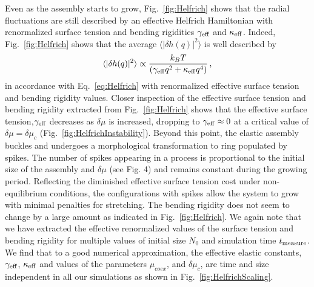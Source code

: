 \documentclass[amsmath,preprintnumbers,10pt,nofootinbib,prl,twocolumn]{revtex4-1}
\begin{document}
Even as the assembly starts to grow, Fig.~\ref{fig:Helfrich} shows that the radial fluctuations are still described by an effective Helfrich Hamiltonian with renormalized surface tension and bending rigidities $\gamma_{\rm eff}$ and $\kappa_{\rm eff}$. Indeed, Fig.~\ref{fig:Helfrich} shows that the average $\langle |\delta h(q)|^2 \rangle$ is well described by 
\begin{equation}
\langle |\delta h(q)|^2 \rangle \propto \frac{k_B T}{(\gamma_{\rm eff} q^2 + \kappa_{\rm eff} q^4)}\,,
\label{eq:HelfrichFT}
\end{equation}
in accordance with Eq.~\ref{eq:Helfrich} with renormalized effective surface tension and bending rigidity values. Closer inspection of the effective surface tension and bending rigidity extracted from Fig.~\ref{fig:Helfrich} shows that the effective surface tension,$\gamma_{\rm eff}$ decreases as $\delta \mu$ is increased, dropping to $\gamma_{\rm eff}\approx 0$ at a critical value of $\delta \mu=\delta \mu_c$ (Fig.~\ref{fig:HelfrichInstability}). Beyond this point, the elastic assembly buckles and undergoes a morphological transformation to ring populated by \textit{}{spikes}. The number of spikes appearing in a process is proportional to the initial size of the assembly and $\delta\mu$ (see Fig. 4) and remains constant during the growing period. 
Reflecting the diminished effective surface tension cost under non-equilibrium conditions, the configurations with spikes allow the system to grow with minimal penalties for stretching. The bending rigidity does not seem to change by a large amount as indicated in Fig.~\ref{fig:Helfrich}. We again note that we have extracted the effective renormalized values of the surface tension and bending rigidity for multiple values of initial size $N_0$ and simulation time $t_{\rm measure}$. We find that to a good numerical approximation, the effective elastic constants, $\gamma_{\rm eff}$, $\kappa_{\rm eff}$ and values of the parameters $\mu_{coex}$, and $\delta \mu_c$, are time and size independent in all our simulations as shown in Fig.~\ref{fig:HelfrichScaling}. 

\end{document}
